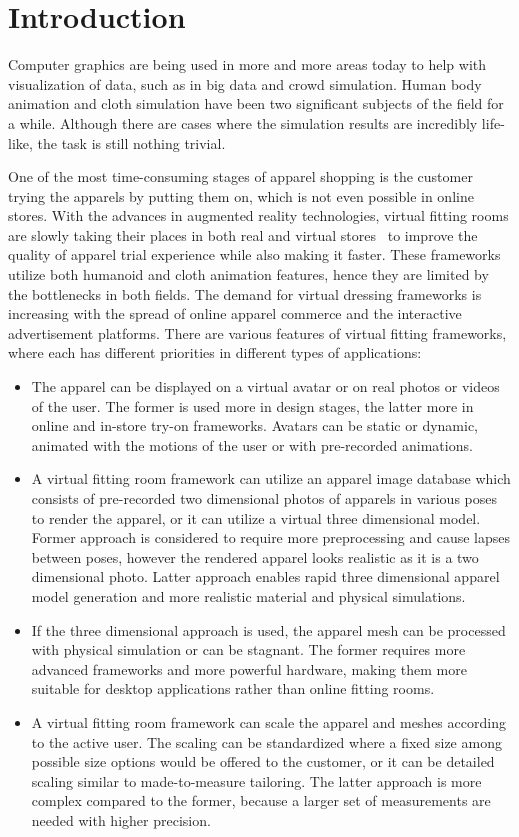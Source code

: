 \chapter{Introduction}
\label{chapter_introduction}

Computer graphics are being used in more and more areas today to help with visualization of data, such as in big data and crowd simulation. Human body animation and cloth simulation have been two significant subjects of the field for a while. Although there are cases where the simulation results are incredibly life-like, the task is still nothing trivial. 

One of the most time-consuming stages of apparel shopping is the customer trying the apparels by putting them on, which is not even possible in online stores. With the advances in augmented reality technologies, virtual fitting rooms are slowly taking their places in both real and virtual stores~\cite{Fitnect2012,Styku2013} to improve the quality of apparel trial experience while also making it faster. These frameworks utilize both humanoid and cloth animation features, hence they are limited by the bottlenecks in both fields. The demand for virtual dressing frameworks is increasing with the spread of online apparel commerce and the interactive advertisement platforms. There are various features of virtual fitting frameworks, where each has different priorities in different types of applications:

\begin{itemize}
  \item The apparel can be displayed on a virtual avatar or on real photos or videos of the user. The former is used more in design stages, the latter more in online and in-store try-on frameworks. Avatars can be static or dynamic, animated with the motions of the user or with pre-recorded animations. 
  \item A virtual fitting room framework can utilize an apparel image database which consists of pre-recorded two dimensional photos of apparels in various poses to render the apparel, or it can utilize a virtual three dimensional model. Former approach is considered to require more preprocessing and cause lapses between poses, however the rendered apparel looks realistic as it is a two dimensional photo. Latter approach enables rapid three dimensional apparel model generation and more realistic material and physical simulations.
  \item If the three dimensional approach is used, the apparel mesh can be processed with physical simulation or can be stagnant. The former requires more advanced frameworks and more powerful hardware, making them more suitable for desktop applications rather than online fitting rooms. 
  \item A virtual fitting room framework can scale the apparel and meshes according to the active user. The scaling can be standardized where a fixed size among possible size options would be offered to the customer, or it can be detailed scaling similar to made-to-measure tailoring. The latter approach is more complex compared to the former, because a larger set of measurements are needed with higher precision.
\end{itemize}


